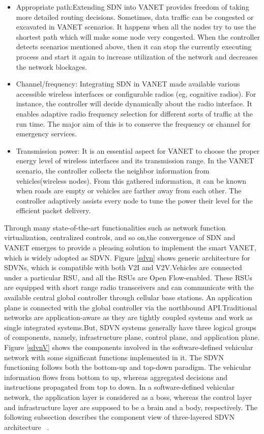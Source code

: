 \documentclass[
  oneside,
  11pt, a4paper,
  footinclude=true,
  headinclude=true,
  cleardoublepage=empty
]{scrbook}
\begin{document}
\begin{itemize}
    \item Appropriate path:Extending SDN into VANET provides freedom of taking more detailed routing decisions. Sometimes, data traffic can be congested or excavated in VANET scenarios. It happens when all the nodes try to use the shortest path which will make some node very congested. When the controller detects scenarios mentioned above, then it can stop the currently executing process and start it again to increase utilization of the network and decreases the network blockages.
    \item Channel/frequency: Integrating SDN in VANET made available various accessible wireless interfaces or configurable radios (eg, cognitive radios). For instance, the controller will decide dynamically about the radio interface. It enables adaptive radio frequency selection for different sorts of traffic at the run time. The major aim of this is to conserve the frequency or channel for emergency services.
    \item Transmission power: It is an essential aspect for VANET to choose the proper energy level of wireless interfaces and its transmission range. In the VANET scenario, the controller collects the neighbor information from vehicles(wireless nodes). From this gathered information, it can be known when roads are empty or vehicles are farther away from each other. The controller adaptively assists every node to tune the power their level for the efficient packet delivery.
\end{itemize}


Through many state-of-the-art functionalities such as network function virtualization, centralized controls, and so on,the convergence of SDN and VANET emerges to provide a pleasing solution to implement the smart VANET, which is widely adopted as SDVN. Figure \ref{sdvn} shows generic architecture for SDVNs, which is compatible with both V2I and V2V.Vehicles are connected under a particular RSU, and all the RSUs are Open Flow-enabled. These RSUs are equipped with short range radio transceivers and can communicate with the available central global controller through cellular base stations. An application plane is connected with the global controller via the northbound API.Traditional networks are application-aware as they are tightly coupled systems and work as single integrated systems.But, SDVN systems generally have three logical groups of components, namely, infrastructure plane, control plane, and application plane. Figure \ref{sdvnV} shows the components involved in the software-defined vehicular network with some significant functions implemented in it. The SDVN functioning follows both the bottom-up and top-down paradigm. The vehicular information flows from bottom to up, whereas aggregated decisions and instructions propagated from top to down. In a software-defined vehicular network, the application layer is considered as a boss, whereas the control layer and infrastructure layer are supposed to be a brain and a body, respectively. The following subsection describes the component view of three-layered SDVN architecture ~\cite{Bhatia2019sdvn}.
\end{document}
